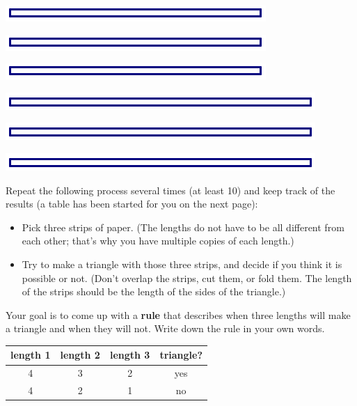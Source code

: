 \begin{center}
\includegraphics{5in}
 
 \includegraphics{5in}

\includegraphics{5in}

\bigskip

\includegraphics{6in}
 
 \includegraphics{6in}

\includegraphics{6in}
\end{center}

\newpage

\begin{problem}
Repeat the following process several times (at least 10) and keep track of the results (a table has been started for you on the next page):
\begin{itemize}
\item
Pick three  strips of paper.  (The lengths do not have to be all different from each other; that's why you have multiple copies of each length.)\\
\item
Try to make a triangle with those three strips, and decide if you think it is possible or not.  (Don't overlap the strips, cut them, or fold them.  The length of the strips should be the length of the sides of the triangle.)
\end{itemize}
Your goal is to come up with a {\bf rule} that describes when three lengths will make a triangle and when they will not. Write down the rule in your own words.
\end{problem}


\bigskip
\begin{center}
\begin{tabular}{|c c c c|}\hline
length 1 & length 2 & length 3 & triangle? \\ \hline\hline
4 & 3 & 2 & yes \\ \hline
4 & 2 & 1 & no \\ \hline
\end{tabular}
\end{center}

